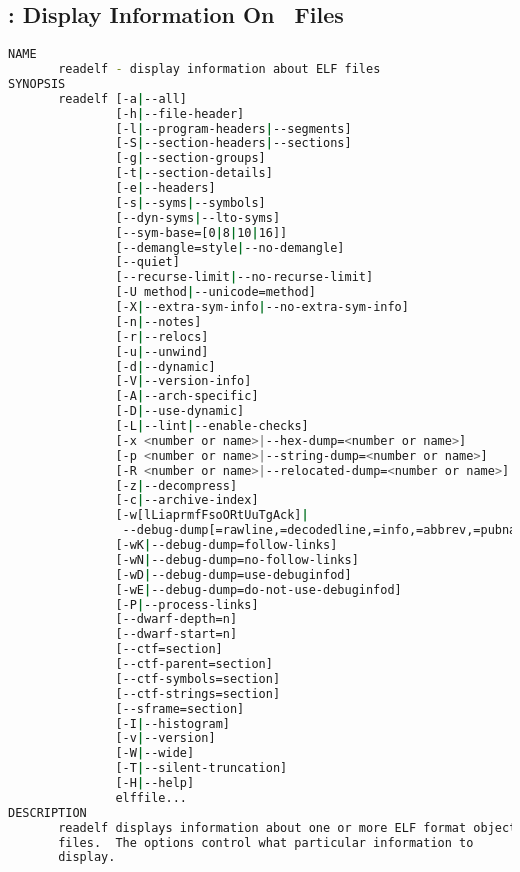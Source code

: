 % 
\subsection{: Display Information On \elf \ Files}

{\tiny{
\begin{lstlisting}[language=bash]
NAME
       readelf - display information about ELF files
SYNOPSIS
       readelf [-a|--all]
               [-h|--file-header]
               [-l|--program-headers|--segments]
               [-S|--section-headers|--sections]
               [-g|--section-groups]
               [-t|--section-details]
               [-e|--headers]
               [-s|--syms|--symbols]
               [--dyn-syms|--lto-syms]
               [--sym-base=[0|8|10|16]]
               [--demangle=style|--no-demangle]
               [--quiet]
               [--recurse-limit|--no-recurse-limit]
               [-U method|--unicode=method]
               [-X|--extra-sym-info|--no-extra-sym-info]
               [-n|--notes]
               [-r|--relocs]
               [-u|--unwind]
               [-d|--dynamic]
               [-V|--version-info]
               [-A|--arch-specific]
               [-D|--use-dynamic]
               [-L|--lint|--enable-checks]
               [-x <number or name>|--hex-dump=<number or name>]
               [-p <number or name>|--string-dump=<number or name>]
               [-R <number or name>|--relocated-dump=<number or name>]
               [-z|--decompress]
               [-c|--archive-index]
               [-w[lLiaprmfFsoORtUuTgAck]|
                --debug-dump[=rawline,=decodedline,=info,=abbrev,=pubnames,=aranges,=macro,=frames,=frames-interp,=str,=str-offsets,=loc,=Ranges,=pubtypes,=trace_info,=trace_abbrev,=trace_aranges,=gdb_index,=addr,=cu_index,=links]]
               [-wK|--debug-dump=follow-links]
               [-wN|--debug-dump=no-follow-links]
               [-wD|--debug-dump=use-debuginfod]
               [-wE|--debug-dump=do-not-use-debuginfod]
               [-P|--process-links]
               [--dwarf-depth=n]
               [--dwarf-start=n]
               [--ctf=section]
               [--ctf-parent=section]
               [--ctf-symbols=section]
               [--ctf-strings=section]
               [--sframe=section]
               [-I|--histogram]
               [-v|--version]
               [-W|--wide]
               [-T|--silent-truncation]
               [-H|--help]
               elffile...
DESCRIPTION
       readelf displays information about one or more ELF format object
       files.  The options control what particular information to
       display.


\end{lstlisting}}}
